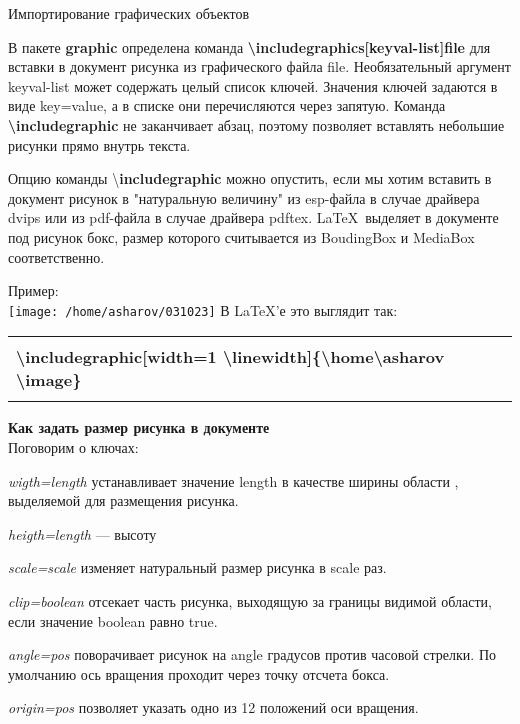 \documentclass[a4paper,14pt,russian]{extreport}
\newcommand{\toCenter}[1]{\begin{center}#1\par\end{center}}
\begin{document}
\toCenter{Импортирование графических объектов}



В пакете \textbf{graphic} определена команда \textbf{\textbackslash includegraphics[keyval-list]{file}} для вставки в документ рисунка из графического файла file. Необязательный аргумент keyval-list может содержать целый список ключей. Значения ключей задаются в виде key=value, а в списке они перечисляются через запятую. Команда \textbf{\textbackslash includegraphic} не заканчивает абзац, поэтому позволяет вставлять небольшие рисунки прямо внутрь текста.

Опцию команды \textbackslash \textbf{includegraphic} можно опустить, если мы хотим вставить в документ рисунок в "натуральную величину" из esp-файла в случае драйвера dvips или из pdf-файла в случае драйвера pdftex. \LaTeX\ выделяет в документе под рисунок бокс, размер которого считывается из BoudingBox и MediaBox соответственно.

Пример:\\
\texttt{[image: /home/asharov/031023]}
\newpage
В \LaTeX 'е это выглядит так:

\begin{center}
\begin{tabular}{|l|}
\hline
 \\
\textbf{\textbackslash includegraphic[width=1 \textbackslash linewidth]\{\textbackslash home\textbackslash asharov \textbackslash image\}}\\
 \\
\hline
\end{tabular}
\end{center}

\bigskip
\textbf{Как задать размер рисунка в документе }\\
Поговорим о ключах:

\textit{wigth=length} устанавливает значение length в качестве ширины области , выделяемой для размещения рисунка.

\textit{heigth=length} --- высоту

\textit{scale=scale} изменяет натуральный размер рисунка в scale раз.

\textit{clip=boolean} отсекает часть рисунка, выходящую за границы видимой области, если значение boolean равно true.

\textit{angle=pos} поворачивает рисунок на angle градусов против часовой стрелки. По умолчанию ось вращения проходит через точку отсчета бокса.

\textit{origin=pos} позволяет указать одно из 12 положений оси вращения. 
\end{document}
